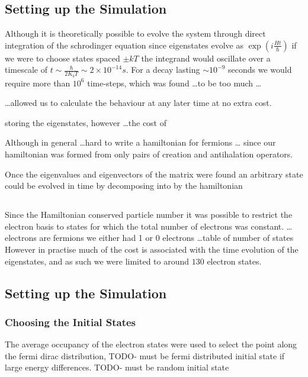 
\subsection{Setting up the Simulation}

Although it is theoretically possible
to evolve the system through direct
integration of the schrodinger equation
since eigenstates evolve
as \(\exp(i\frac{Ht}{\hbar})\)
if we were to choose states
spaced \(\pm kT\) the integrand
would oscillate over a timescale
of \(t \sim \frac{\hbar}{2K_b T} \sim 2\times{}10^{-14}s\).
For a decay lasting \(\sim 10^{-9}\)
seconds we would require more than \(10^{6}\)
time-steps, which was found \ldots to be too much \ldots

\ldots allowed us to calculate
the behaviour at any later time
at no extra cost.

storing the eigenstates, however
\ldots the cost of


Although in general \ldots hard to write
a hamiltonian for fermions \ldots
since our hamiltonian was formed from only
pairs of creation and antihalation
operators.

Once the eigenvalues and eigenvectors of the
matrix were found an arbitrary state could
be evolved in time by decomposing into by the hamiltonian

\subsection{}
Since the Hamiltonian conserved particle number
it was possible to restrict the electron basis
to states for which the total number of electrons
was constant.
\ldots electrons are fermions we either had 1 or
0 electrons
\ldots table of number of states
However in practise much of the cost
is associated with the time evolution of
the eigenstates, and as such we were limited
to around \(130\) electron states.

\subsection{Setting up the Simulation}

\subsubsection{Choosing the Initial States}
The average occupancy of the electron states
were used to select the point along the fermi
dirac distribution,
TODO- must be fermi distributed initial state
if large energy differences.
TODO- must be random initial state


